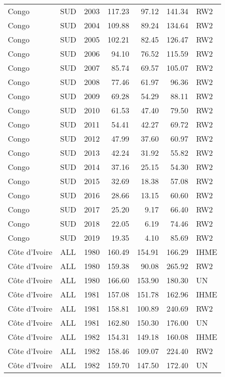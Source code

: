 \begin{longtable}{lllrrrl}
  Congo & SUD & 2003 & 117.23 & 97.12 & 141.34 & RW2 \\ 
  Congo & SUD & 2004 & 109.88 & 89.24 & 134.64 & RW2 \\ 
  Congo & SUD & 2005 & 102.21 & 82.45 & 126.47 & RW2 \\ 
  Congo & SUD & 2006 & 94.10 & 76.52 & 115.59 & RW2 \\ 
  Congo & SUD & 2007 & 85.74 & 69.57 & 105.07 & RW2 \\ 
  Congo & SUD & 2008 & 77.46 & 61.97 & 96.36 & RW2 \\ 
  Congo & SUD & 2009 & 69.28 & 54.29 & 88.11 & RW2 \\ 
  Congo & SUD & 2010 & 61.53 & 47.40 & 79.50 & RW2 \\ 
  Congo & SUD & 2011 & 54.41 & 42.27 & 69.72 & RW2 \\ 
  Congo & SUD & 2012 & 47.99 & 37.60 & 60.97 & RW2 \\ 
  Congo & SUD & 2013 & 42.24 & 31.92 & 55.82 & RW2 \\ 
  Congo & SUD & 2014 & 37.16 & 25.15 & 54.30 & RW2 \\ 
  Congo & SUD & 2015 & 32.69 & 18.38 & 57.08 & RW2 \\ 
  Congo & SUD & 2016 & 28.66 & 13.15 & 60.60 & RW2 \\ 
  Congo & SUD & 2017 & 25.20 & 9.17 & 66.40 & RW2 \\ 
  Congo & SUD & 2018 & 22.05 & 6.19 & 74.46 & RW2 \\ 
  Congo & SUD & 2019 & 19.35 & 4.10 & 85.69 & RW2 \\ 
  C\^{o}te d'Ivoire & ALL & 1980 & 160.49 & 154.91 & 166.29 & IHME \\ 
  C\^{o}te d'Ivoire & ALL & 1980 & 159.38 & 90.08 & 265.92 & RW2 \\ 
  C\^{o}te d'Ivoire & ALL & 1980 & 166.60 & 153.90 & 180.30 & UN \\ 
  C\^{o}te d'Ivoire & ALL & 1981 & 157.08 & 151.78 & 162.96 & IHME \\ 
  C\^{o}te d'Ivoire & ALL & 1981 & 158.81 & 100.89 & 240.69 & RW2 \\ 
  C\^{o}te d'Ivoire & ALL & 1981 & 162.80 & 150.30 & 176.00 & UN \\ 
  C\^{o}te d'Ivoire & ALL & 1982 & 154.31 & 149.18 & 160.08 & IHME \\ 
  C\^{o}te d'Ivoire & ALL & 1982 & 158.46 & 109.07 & 224.40 & RW2 \\ 
  C\^{o}te d'Ivoire & ALL & 1982 & 159.70 & 147.50 & 172.40 & UN \\ 

\end{longtable}
